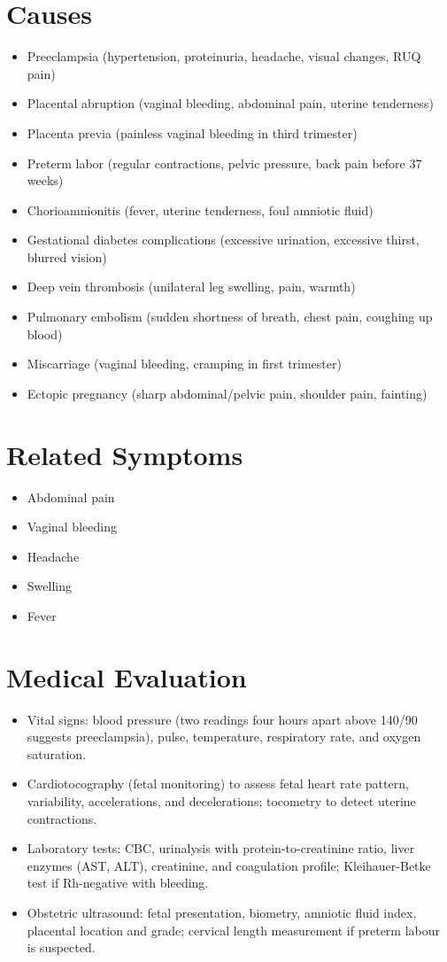 \section*{Causes}
\begin{itemize}
  \item Preeclampsia (hypertension, proteinuria, headache, visual changes, RUQ pain)
  \item Placental abruption (vaginal bleeding, abdominal pain, uterine tenderness)
  \item Placenta previa (painless vaginal bleeding in third trimester)
  \item Preterm labor (regular contractions, pelvic pressure, back pain before 37 weeks)
  \item Chorioamnionitis (fever, uterine tenderness, foul amniotic fluid)
  \item Gestational diabetes complications (excessive urination, excessive thirst, blurred vision)
  \item Deep vein thrombosis (unilateral leg swelling, pain, warmth)
  \item Pulmonary embolism (sudden shortness of breath, chest pain, coughing up blood)
  \item Miscarriage (vaginal bleeding, cramping in first trimester)
  \item Ectopic pregnancy (sharp abdominal/pelvic pain, shoulder pain, fainting)
\end{itemize}

\section*{Related Symptoms}
\begin{itemize}
  \item Abdominal pain
  \item Vaginal bleeding
  \item Headache
  \item Swelling
  \item Fever
\end{itemize}

\section*{Medical Evaluation}
\begin{itemize}
  \item Vital signs: blood pressure (two readings four hours apart above 140/90 suggests preeclampsia), pulse, temperature, respiratory rate, and oxygen saturation.
  \item Cardiotocography (fetal monitoring) to assess fetal heart rate pattern, variability, accelerations, and decelerations; tocometry to detect uterine contractions.
  \item Laboratory tests: CBC, urinalysis with protein-to-creatinine ratio, liver enzymes (AST, ALT), creatinine, and coagulation profile; Kleihauer-Betke test if Rh-negative with bleeding.
  \item Obstetric ultrasound: fetal presentation, biometry, amniotic fluid index, placental location and grade; cervical length measurement if preterm labour is suspected.
\end{itemize}

